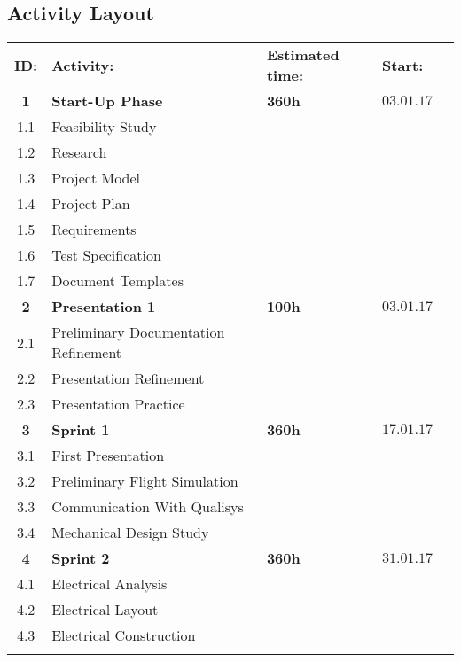 \begin{center}
\section*{\textbf{Activity Layout}}
\begin{tabular}{cllll}
\rowcolor{cadetgrey}
\textbf{ID:}    &\textbf{Activity:} 	 &\textbf{Estimated time:}    &\textbf{Start:}  \\ %
    
\textbf{1} & \textbf{Start-Up Phase} & \textbf{360h} & $03.01.17$ 
\\\rowcolor{gainsboro}
1.1       & Feasibility Study     &     &  \\
1.2       & Research     &     &  \\\rowcolor{gainsboro}
1.3       & Project Model     &     & \\
1.4       & Project Plan     &     & 
\\\rowcolor{gainsboro}
1.5       & Requirements     &     & \\
1.6       & Test Specification     &     & 
\\\rowcolor{gainsboro}
1.7       & Document Templates     &    & \\
\textbf{2} & \textbf{Presentation 1}     & \textbf{100h}    & $03.01.17$ 
\\\rowcolor{gainsboro}
2.1     & Preliminary Documentation Refinement  &    & \\
2.2     & Presentation Refinement  &    &
\\\rowcolor{gainsboro}
2.3     & Presentation Practice  &    & \\
\textbf{3} & \textbf{Sprint 1}     & \textbf{360h}     & $17.01.17$ 
\\\rowcolor{gainsboro}
3.1     & First Presentation &  & \\
3.2     & Preliminary Flight Simulation &  & \\\rowcolor{gainsboro}
3.3     & Communication With Qualisys &  & \\
3.4     & Mechanical Design Study &  & 
\\\rowcolor{gainsboro}
\textbf{4} & \textbf{Sprint 2}     & \textbf{360h}     & $31.01.17$ \\
4.1     & Electrical Analysis &  &  \\\rowcolor{gainsboro}
4.2     & Electrical Layout &  & \\
4.3     & Electrical Construction & & \\ \rowcolor{gainsboro}

\end{tabular}
\end{center}
